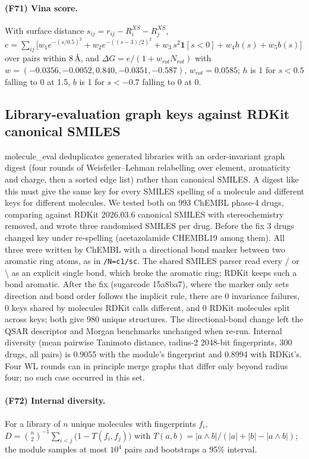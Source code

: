 \paragraph{(F71) Vina score.} With surface distance $s_{ij}=r_{ij}-R^{XS}_i-R^{XS}_j$, $e=\sum_{ij}\big[w_1e^{-(s/0.5)^2}+w_2e^{-((s-3)/2)^2}+w_3\,s^2\mathbf 1[s<0]+w_4h(s)+w_5b(s)\big]$ over pairs within 8\,\AA, and $\Delta G=e/(1+w_{rot}N_{rot})$ with $w=(-0.0356,-0.0052,0.840,-0.0351,-0.587)$, $w_{rot}=0.0585$; $h$ is 1 for $s<0.5$ falling to 0 at 1.5, $b$ is 1 for $s<-0.7$ falling to 0 at 0.
\subsection{Library-evaluation graph keys against RDKit canonical SMILES}
molecule\_eval deduplicates generated libraries with an order-invariant graph digest (four rounds of Weisfeiler--Lehman relabelling over element, aromaticity and charge, then a sorted edge list) rather than canonical SMILES. A digest like this must give the same key for every SMILES spelling of a molecule and different keys for different molecules. We tested both on 993 ChEMBL phase-4 drugs, comparing against RDKit 2026.03.6 canonical SMILES with stereochemistry removed, and wrote three randomised SMILES per drug. Before the fix 3 drugs changed key under re-spelling (acetazolamide CHEMBL19 among them). All three were written by ChEMBL with a directional bond marker between two aromatic ring atoms, as in \texttt{/N=c1/sc}. The shared SMILES parser read every / or \textbackslash{} as an explicit single bond, which broke the aromatic ring; RDKit keeps such a bond aromatic. After the fix (sugarcode 15a8ba7), where the marker only sets direction and bond order follows the implicit rule, there are 0 invariance failures, 0 keys shared by molecules RDKit calls different, and 0 RDKit molecules split across keys; both give 980 unique structures. The directional-bond change left the QSAR descriptor and Morgan benchmarks unchanged when re-run. Internal diversity (mean pairwise Tanimoto distance, radius-2 2048-bit fingerprints, 300 drugs, all pairs) is 0.9055 with the module's fingerprint and 0.8994 with RDKit's. Four WL rounds can in principle merge graphs that differ only beyond radius four; no such case occurred in this set.
\paragraph{(F72) Internal diversity.} For a library of $n$ unique molecules with fingerprints $f_i$, $D=\binom n2^{-1}\sum_{i<j}\big(1-T(f_i,f_j)\big)$ with $T(a,b)=|a\wedge b|/(|a|+|b|-|a\wedge b|)$; the module samples at most $10^4$ pairs and bootstraps a 95\% interval.
